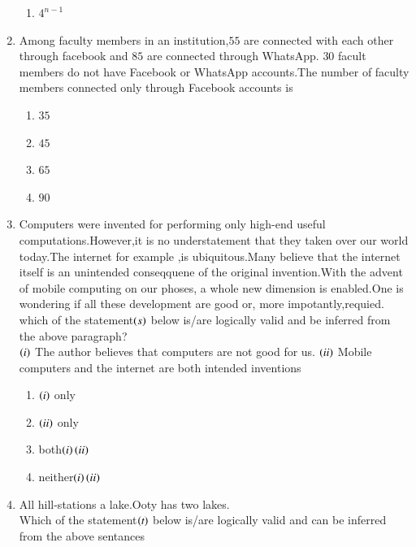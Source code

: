 \documentclass[journal,12pt,twocolumn]{IEEEtran}
\theoremstyle{remark}
\begin{document}
\begin{enumerate}
\begin{enumerate}
        \item$4^{n-1}$
        \end{enumerate}
    \item Among  faculty members in an institution,$55$ are connected with each other through facebook and $85$ are connected through WhatsApp. $30$ facult members do not have Facebook or WhatsApp accounts.The number of faculty members connected only through Facebook accounts is\\
    \begin{enumerate}
        \item$35$\\
        \item$45$\\
        \item$65$\\
        \item$90$
    \end{enumerate}
    \item Computers were invented for performing only high-end useful computations.However,it is no understatement that they taken over our world today.The internet for example ,is ubiquitous.Many believe that the internet itself is an unintended conseqquene of the original invention.With the advent of mobile computing on our phoses, a whole new dimension is enabled.One is wondering if all these development are good or, more impotantly,requied.\\
    which of the statement$\left(s\right)$ below is/are logically valid and be inferred from the above paragraph?\\
    $\left(i\right)$ The author believes that computers are not good for us.
    $\left(ii\right)$ Mobile computers and the internet are both intended inventions\\
    \begin{enumerate}
        \item $\left(i\right)$ only\\
        \item $\left(ii\right)$ only\\
        \item both$\left(i\right)\left(ii\right)$\\
        \item neither$\left(i\right)\left(ii\right)$
    \end{enumerate}
    \item All hill-stations a lake.Ooty has two lakes.\\
    Which of the statement$\left(t\right)$ below is/are logically valid and can be inferred from the above sentances\\

\end{enumerate}
\end{document}
